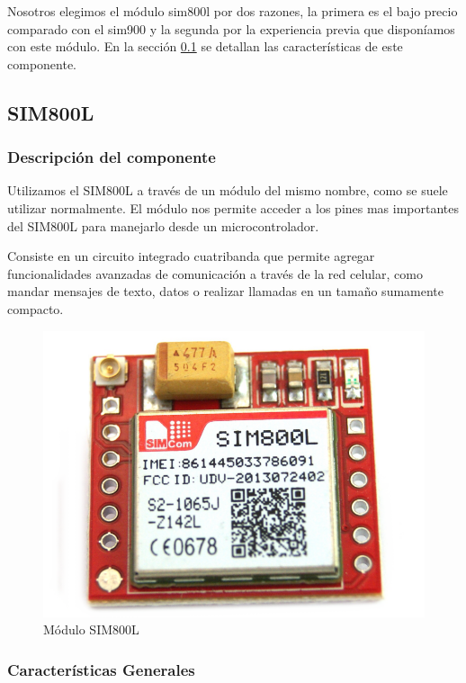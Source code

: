 Nosotros elegimos el módulo sim800l por dos razones, la primera es el bajo precio comparado con el sim900 y la segunda por la experiencia previa
que disponíamos con este módulo.
En la sección \ref{cap:sim800l} se detallan las características de este componente.


\subsection{SIM800L} \label{cap:sim800l}

\subsubsection{Descripción del componente}

Utilizamos el SIM800L a través de un módulo del mismo nombre, como se suele utilizar normalmente. El módulo nos permite acceder a los pines 
mas importantes del SIM800L para manejarlo desde un microcontrolador.\par
Consiste en un circuito integrado cuatribanda que permite agregar funcionalidades avanzadas de comunicación a través de la red celular, como mandar mensajes de texto,
datos o realizar llamadas en un tamaño sumamente compacto. 

\begin{figure}[htb]
	\centering
	\includegraphics[scale=0.2]{images/sim800l.png}
    \caption{Módulo SIM800L}
	\label{fig:sim800l}
\end{figure}

\subsubsection{Características Generales}

